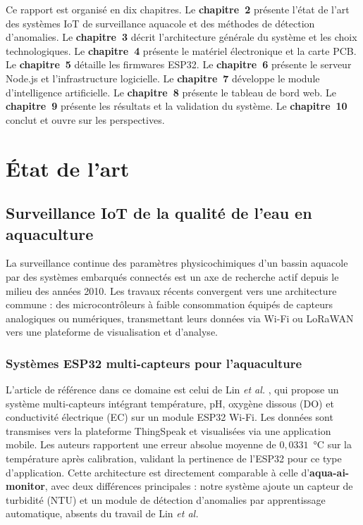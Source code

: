 \documentclass[12pt,a4paper]{report}
\begin{document}
Ce rapport est organisé en dix chapitres. Le \textbf{chapitre~2} présente l'état de l'art
des systèmes IoT de surveillance aquacole et des méthodes de détection d'anomalies. Le
\textbf{chapitre~3} décrit l'architecture générale du système et les choix technologiques.
Le \textbf{chapitre~4} présente le matériel électronique et la carte PCB. Le
\textbf{chapitre~5} détaille les firmwares ESP32. Le \textbf{chapitre~6} présente le serveur
Node.js et l'infrastructure logicielle. Le \textbf{chapitre~7} développe le module
d'intelligence artificielle. Le \textbf{chapitre~8} présente le tableau de bord web. Le
\textbf{chapitre~9} présente les résultats et la validation du système. Le
\textbf{chapitre~10} conclut et ouvre sur les perspectives.

\chapter{État de l'art}
\label{chap:etat_art}

\section{Surveillance IoT de la qualité de l'eau en aquaculture}

La surveillance continue des paramètres physicochimiques d'un bassin aquacole
par des systèmes embarqués connectés est un axe de recherche actif depuis le milieu
des années 2010. Les travaux récents convergent vers une architecture commune :
des microcontrôleurs à faible consommation équipés de capteurs analogiques ou numériques,
transmettant leurs données via Wi-Fi ou LoRaWAN vers une plateforme de visualisation
et d'analyse.

\subsection{Systèmes ESP32 multi-capteurs pour l'aquaculture}

L'article de référence dans ce domaine est celui de Lin \textit{et al.}
\cite{lin2021aqua}, qui propose un système multi-capteurs intégrant température, pH,
oxygène dissous (DO) et conductivité électrique (EC) sur un module ESP32 Wi-Fi.
Les données sont transmises vers la plateforme ThingSpeak et visualisées via une
application mobile. Les auteurs rapportent une erreur absolue moyenne de
$0{,}0331$~°C sur la température après calibration, validant la pertinence de
l'ESP32 pour ce type d'application. Cette architecture est directement comparable
à celle d'\textbf{aqua-ai-monitor}, avec deux différences principales : notre
système ajoute un capteur de turbidité (NTU) et un module de détection d'anomalies
par apprentissage automatique, absents du travail de Lin \textit{et al.}
\end{document}
